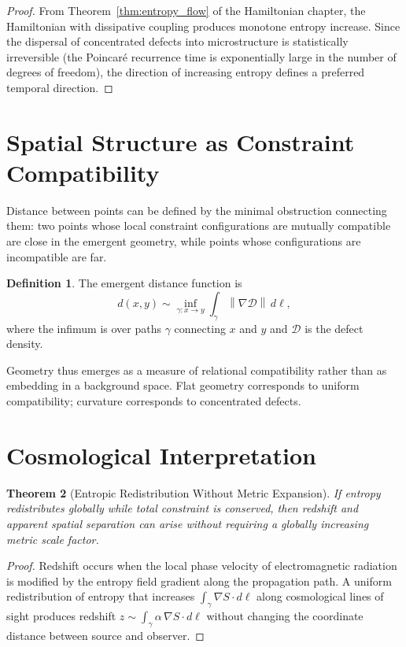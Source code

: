 \documentclass[12pt,a4paper,openany]{book}
\theoremstyle{plain}
\newtheorem{theorem}{Theorem}[chapter]
\theoremstyle{definition}
\newtheorem{definition}[theorem]{Definition}
\theoremstyle{remark}
\newcommand{\norm}[1]{\left\|#1\right\|}
\begin{document}
\begin{proof}
From Theorem~\ref{thm:entropy_flow} of the Hamiltonian chapter, the Hamiltonian with dissipative coupling produces monotone entropy increase. Since the dispersal of concentrated defects into microstructure is statistically irreversible (the Poincaré recurrence time is exponentially large in the number of degrees of freedom), the direction of increasing entropy defines a preferred temporal direction.
\end{proof}

\section{Spatial Structure as Constraint Compatibility}

Distance between points can be defined by the minimal obstruction connecting them: two points whose local constraint configurations are mutually compatible are close in the emergent geometry, while points whose configurations are incompatible are far.

\begin{definition}
The emergent distance function is
\[
d(x,y) \sim \inf_{\gamma: x \to y} \int_\gamma \norm{\nabla\mathcal{D}}\,d\ell,
\]
where the infimum is over paths $\gamma$ connecting $x$ and $y$ and $\mathcal{D}$ is the defect density.
\end{definition}

Geometry thus emerges as a measure of relational compatibility rather than as embedding in a background space. Flat geometry corresponds to uniform compatibility; curvature corresponds to concentrated defects.

\section{Cosmological Interpretation}

\begin{theorem}[Entropic Redistribution Without Metric Expansion]
\label{thm:no_expansion_required}
If entropy redistributes globally while total constraint is conserved, then redshift and apparent spatial separation can arise without requiring a globally increasing metric scale factor.
\end{theorem}

\begin{proof}
Redshift occurs when the local phase velocity of electromagnetic radiation is modified by the entropy field gradient along the propagation path. A uniform redistribution of entropy that increases $\int_\gamma \nabla S\cdot d\ell$ along cosmological lines of sight produces redshift $z \sim \int_\gamma \alpha\,\nabla S\cdot d\ell$ without changing the coordinate distance between source and observer.
\end{proof}
\end{document}
